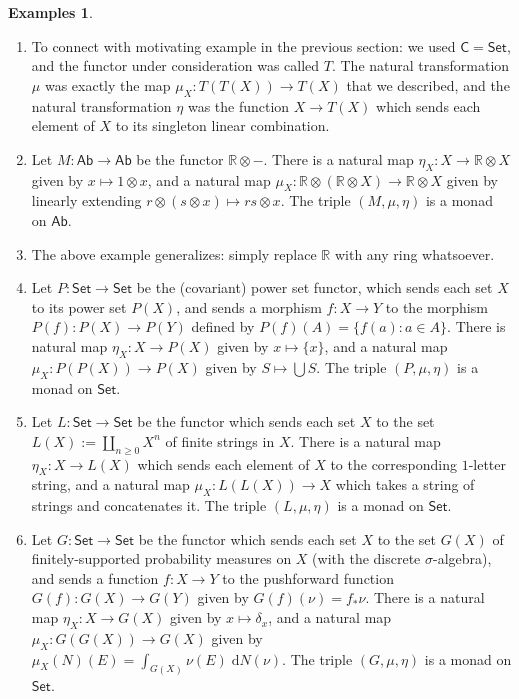 \documentclass{article}
\theoremstyle{definition}
\newtheorem{examples}{Examples}
\newcommand{\C}{\mathsf{C}}
\begin{document}
\begin{examples}$\ $
\begin{enumerate}[label = \textbf{\Alph*.}]
    \item To connect with motivating example in the previous section: we used $\C = \mathsf{Set}$, and the functor under consideration was called $T$. The natural transformation $\mu$ was exactly the map $\mu_X : T(T(X)) \to T(X)$ that we described, and the natural transformation $\eta$ was the function $X \to T(X)$ which sends each element of $X$ to its singleton linear combination.
    \item Let $M : \mathsf{Ab} \to \mathsf{Ab}$ be the functor $\mathbb{R} \otimes {-}$. There is a natural map $\eta_X : X \to \mathbb{R} \otimes X$ given by $x \mapsto 1 \otimes x$, and a natural map $\mu_X : \mathbb{R} \otimes (\mathbb{R} \otimes X) \to \mathbb{R} \otimes X$ given by linearly extending $r \otimes (s \otimes x) \mapsto rs \otimes x$. The triple $(M, \mu, \eta)$ is a monad on $\mathsf{Ab}$.
    \item The above example generalizes: simply replace $\mathbb{R}$ with any ring whatsoever.
    \item Let $P : \mathsf{Set} \to \mathsf{Set}$ be the (covariant) power set functor, which sends each set $X$ to its power set $P(X)$, and sends a morphism $f : X \to Y$ to the morphism $P(f) : P(X) \to P(Y)$ defined by $P(f)(A) = \{f(a) : a \in A\}$. There is natural map $\eta_X : X \to P(X)$ given by $x \mapsto \{x\}$, and a natural map $\mu_X : P(P(X)) \to P(X)$ given by $S \mapsto \bigcup S$. The triple $(P, \mu, \eta)$ is a monad on $\mathsf{Set}$.
    \item Let $L : \mathsf{Set} \to \mathsf{Set}$ be the functor which sends each set $X$ to the set $L(X) := \coprod_{n \geq 0} X^n$ of finite strings in $X$. There is a natural map $\eta_X : X \to L(X)$ which sends each element of $X$ to the corresponding $1$-letter string, and a natural map $\mu_X : L(L(X)) \to X$ which takes a string of strings and concatenates it. The triple $(L, \mu, \eta)$ is a monad on $\mathsf{Set}$.
    \item Let $G : \mathsf{Set} \to \mathsf{Set}$ be the functor which sends each set $X$ to the set $G(X)$ of finitely-supported probability measures on $X$ (with the discrete $\sigma$-algebra), and sends a function $f : X \to Y$ to the pushforward function $G(f) : G(X) \to G(Y)$ given by $G(f)(\nu) = f_* \nu$. There is a natural map $\eta_X : X \to G(X)$ given by $x \mapsto \delta_x$, and a natural map $\mu_X : G(G(X)) \to G(X)$ given by $\mu_X(N)(E) = \int_{G(X)} \nu(E) \; \mathrm{d}N(\nu)$. The triple $(G, \mu, \eta)$ is a monad on $\mathsf{Set}$.

\end{enumerate}
\end{examples}
\end{document}
